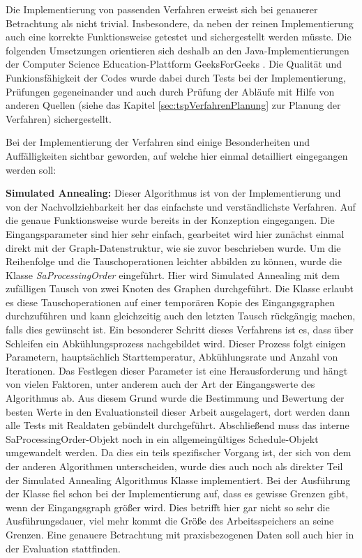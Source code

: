 Die Implementierung von passenden Verfahren erweist sich bei genauerer Betrachtung als nicht trivial. Insbesondere, da neben der reinen Implementierung auch eine korrekte Funktionsweise getestet und sichergestellt werden müsste. Die folgenden Umsetzungen orientieren sich deshalb an den Java-Implementierungen der Computer Science Education-Plattform GeeksForGeeks \cite{geeksForGeeks}. Die Qualität und Funkionsfähigkeit der Codes wurde dabei durch Tests bei der Implementierung, Prüfungen gegeneinander und auch durch Prüfung der Abläufe mit Hilfe von anderen Quellen (siehe das Kapitel \ref{sec:tspVerfahrenPlanung} zur Planung der Verfahren) sichergestellt.

Bei der Implementierung der Verfahren sind einige Besonderheiten und Auffälligkeiten sichtbar geworden, auf welche hier einmal detailliert eingegangen werden soll:

\textbf{Simulated Annealing:} Dieser Algorithmus ist von der Implementierung und von der Nachvollziehbarkeit her das einfachste und verständlichste Verfahren. Auf die genaue Funktionsweise wurde bereits in der Konzeption eingegangen. Die Eingangsparameter sind hier sehr einfach, gearbeitet wird hier zunächst einmal direkt mit der Graph-Datenstruktur, wie sie zuvor beschrieben wurde. Um die Reihenfolge und die Tauschoperationen leichter abbilden zu können, wurde die Klasse \textit{SaProcessingOrder} eingeführt. Hier wird Simulated Annealing mit dem zufälligen Tausch von zwei Knoten des Graphen durchgeführt. Die Klasse erlaubt es diese Tauschoperationen auf einer temporären Kopie des Eingangsgraphen durchzuführen und kann gleichzeitig auch den letzten Tausch rückgängig machen, falls dies gewünscht ist. Ein besonderer Schritt dieses Verfahrens ist es, dass über Schleifen ein Abkühlungsprozess nachgebildet wird. Dieser Prozess folgt einigen Parametern, hauptsächlich Starttemperatur, Abkühlungsrate und Anzahl von Iterationen. Das Festlegen dieser Parameter ist eine Herausforderung und hängt von vielen Faktoren, unter anderem auch der Art der Eingangswerte des Algorithmus ab. Aus diesem Grund wurde die Bestimmung und Bewertung der besten Werte in den Evaluationsteil dieser Arbeit ausgelagert, dort werden dann alle Tests mit Realdaten gebündelt durchgeführt. Abschließend muss das interne SaProcessingOrder-Objekt noch in ein allgemeingültiges Schedule-Objekt umgewandelt werden. Da dies ein teils spezifischer Vorgang ist, der sich von dem der anderen Algorithmen unterscheiden, wurde dies auch noch als direkter Teil der Simulated Annealing Algorithmus Klasse implementiert. Bei der Ausführung der Klasse fiel schon bei der Implementierung auf, dass es gewisse Grenzen gibt, wenn der Eingangsgraph größer wird. Dies betrifft hier gar nicht so sehr die Ausführungsdauer, viel mehr kommt die Größe des Arbeitsspeichers an seine Grenzen. Eine genauere Betrachtung mit praxisbezogenen Daten soll auch hier in der Evaluation stattfinden.

